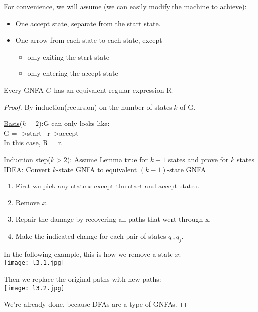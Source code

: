 For convenience, we will assume (we can easily modify the machine to achieve):
\begin{itemize}
    \item One accept state, separate from the start state.
    \item One arrow from each state to each state, except
    \begin{itemize}
        \item only exiting the start state
        \item only entering the accept state
    \end{itemize}
\end{itemize}

\begin{lemma}
    Every GNFA \(G\) has an equivalent regular expression R.
\end{lemma}
\begin{proof}
    By induction(recursion) on the number of states \(k\) of G. 

    \hfill\break
    \underline{Basis}(\(k =2\)):G can only looks like:\\ G = ->start --r-->accept\\
    In this case, R = r.

    \hfill\break
    \underline{Induction step(\(k > 2\))}: Assume Lemma true for \(k - 1\) states and prove for \(k\) states \\
    IDEA: Convert \(k\)-state GNFA to equivalent \((k - 1)\)-state GNFA  
    \\
    \begin{enumerate}
        \item First we pick any state \(x\) except the start and accept states.
        \item Remove \(x\).
        \item Repair the damage by recovering all paths that went through x. 
        \item Make the indicated change for each pair of states \(q_i, q_j\).
    \end{enumerate}

    In the following example, this is how we remove a state \(x\):\\
    \texttt{[image: l3.1.jpg]}

    Then we replace the original paths with new paths:\\
    \texttt{[image: l3.2.jpg]}

    We're already done, because DFAs are a type of GNFAs.
\end{proof}


